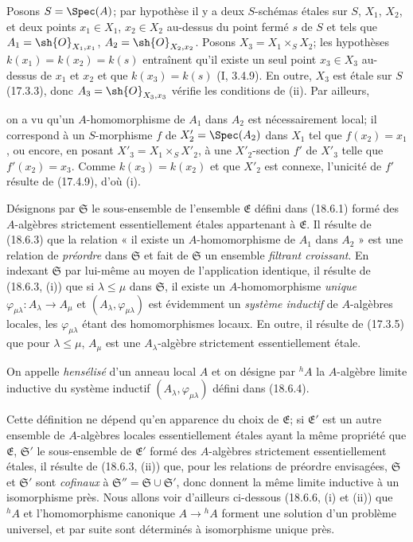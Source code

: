 Posons $S=\Spec(A)$; par hypothèse il y a deux $S$-schémas étales sur $S$, $X_1$, $X_2$, et deux points $x_1\in X_1$, $x_2\in X_2$ au-dessus du point fermé $s$ de $S$ et tels que $A_1=\sh{O}_{X_1,x_1}$, $A_2=\sh{O}_{X_2,x_2}$. Posons $X_3=X_1\times_S X_2$; les hypothèses $k(x_1)=k(x_2)=k(s)$ entraînent qu'il existe un seul point $x_3\in X_3$ au-dessus de $x_1$ et $x_2$ et que $k(x_3)=k(s)$ (I, 3.4.9). En outre, $X_3$ est étale sur $S$ (17.3.3), donc $A_3=\sh{O}_{X_3,x_3}$ vérifie les conditions de (ii). Par ailleurs,


on a vu qu'un $A$-homomorphisme de $A_1$ dans $A_2$ est nécessairement local; il correspond à un $S$-morphisme $f$ de $X'_2=\Spec(A_2)$ dans $X_1$ tel que $f(x_2)=x_1$, ou encore, en posant $X'_3=X_1\times_S X'_2$, à une $X'_2$-section $f'$ de $X'_3$ telle que $f'(x_2)=x_3$. Comme $k(x_3)=k(x_2)$ et que $X'_2$ est connexe, l'unicité de $f'$ résulte de (17.4.9), d'où (i).

\begin{env}[18.6.4]
\label{IV.18.6.4}
Désignons par $\mathfrak S$ le sous-ensemble de l'ensemble $\mathfrak E$ défini dans (18.6.1) formé des $A$-algèbres strictement essentiellement étales appartenant à $\mathfrak E$. Il résulte de (18.6.3) que la relation « il existe un $A$-homomorphisme de $A_1$ dans $A_2$ » est une relation de \emph{préordre} dans $\mathfrak S$ et fait de $\mathfrak S$ un ensemble \emph{filtrant croissant}. En indexant $\mathfrak S$ par lui-même au moyen de l'application identique, il résulte de (18.6.3, (i)) que si $\lambda\leq\mu$ dans $\mathfrak S$, il existe un $A$-homomorphisme \emph{unique} $\varphi_{\mu\lambda}:A_\lambda\to A_\mu$ et $(A_\lambda,\varphi_{\mu\lambda})$ est évidemment un \emph{système inductif} de $A$-algèbres locales, les $\varphi_{\mu\lambda}$ étant des homomorphismes locaux. En outre, il résulte de (17.3.5) que pour $\lambda\leq\mu$, $A_\mu$ est une $A_\lambda$-algèbre strictement essentiellement étale.
\end{env}

\begin{definition}[18.6.5]
\label{IV.18.6.5}
On appelle \emph{hensélisé} d'un anneau local $A$ et on désigne par ${}^h\!A$ la $A$-algèbre limite inductive du système inductif $(A_\lambda,\varphi_{\mu\lambda})$ défini dans (18.6.4).
\end{definition}

Cette définition ne dépend qu'en apparence du choix de $\mathfrak E$; si $\mathfrak E'$ est un autre ensemble de $A$-algèbres locales essentiellement étales ayant la même propriété que $\mathfrak E$, $\mathfrak S'$ le sous-ensemble de $\mathfrak E'$ formé des $A$-algèbres strictement essentiellement étales, il résulte de (18.6.3, (ii)) que, pour les relations de préordre envisagées, $\mathfrak S$ et $\mathfrak S'$ sont \emph{cofinaux} à $\mathfrak S''=\mathfrak S\cup\mathfrak S'$, donc donnent la même limite inductive à un isomorphisme près. Nous allons voir d'ailleurs ci-dessous (18.6.6, (i) et (ii)) que ${}^h\!A$ et l'homomorphisme canonique $A\to{}^h\!A$ forment une solution d'un problème universel, et par suite sont déterminés à isomorphisme unique près.

